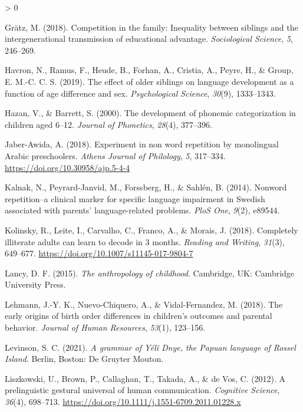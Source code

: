 \documentclass[
  english,
  ,man,floatsintext]{apa6}
\newlength{\cslhangindent}
\newenvironment{CSLReferences}[2] %
 {%
  \setlength{\parindent}{0pt}
  \ifodd #1 \everypar{\setlength{\hangindent}{\cslhangindent}}\ignorespaces\fi
  \ifnum #2 > 0
  \setlength{\parskip}{#2\baselineskip}
  \fi
 }%
 {}
\begin{document}
\begin{CSLReferences}{1}{0}
\leavevmode\hypertarget{ref-gratz2018competition}{}%
Grätz, M. (2018). Competition in the family: Inequality between siblings and the intergenerational transmission of educational advantage. \emph{Sociological Science}, \emph{5}, 246--269.

\leavevmode\hypertarget{ref-havron2019effect}{}%
Havron, N., Ramus, F., Heude, B., Forhan, A., Cristia, A., Peyre, H., \& Group, E. M.-C. C. S. (2019). The effect of older siblings on language development as a function of age difference and sex. \emph{Psychological Science}, \emph{30}(9), 1333--1343.

\leavevmode\hypertarget{ref-hazan2000development}{}%
Hazan, V., \& Barrett, S. (2000). The development of phonemic categorization in children aged 6--12. \emph{Journal of Phonetics}, \emph{28}(4), 377--396.

\leavevmode\hypertarget{ref-jabere2018xperiment}{}%
Jaber-Awida, A. (2018). Experiment in non word repetition by monolingual {A}rabic preschoolers. \emph{Athens Journal of Philology}, \emph{5}, 317--334. \url{https://doi.org/10.30958/ajp.5-4-4}

\leavevmode\hypertarget{ref-kalnak2014nonword}{}%
Kalnak, N., Peyrard-Janvid, M., Forssberg, H., \& Sahlén, B. (2014). Nonword repetition--a clinical marker for specific language impairment in {S}wedish associated with parents' language-related problems. \emph{PloS One}, \emph{9}(2), e89544.

\leavevmode\hypertarget{ref-kolinsky2018completely}{}%
Kolinsky, R., Leite, I., Carvalho, C., Franco, A., \& Morais, J. (2018). Completely illiterate adults can learn to decode in 3 months. \emph{Reading and Writing}, \emph{31}(3), 649--677. \url{https://doi.org/10.1007/s11145-017-9804-7}

\leavevmode\hypertarget{ref-lancy2015anthropology}{}%
Lancy, D. F. (2015). \emph{The anthropology of childhood}. Cambridge, UK: Cambridge University Press.

\leavevmode\hypertarget{ref-lehmann2018early}{}%
Lehmann, J.-Y. K., Nuevo-Chiquero, A., \& Vidal-Fernandez, M. (2018). The early origins of birth order differences in children's outcomes and parental behavior. \emph{Journal of Human Resources}, \emph{53}(1), 123--156.

\leavevmode\hypertarget{ref-levinsonYDgrammar}{}%
Levinson, S. C. (2021). \emph{A grammar of {Yélî D}nye, the {P}apuan language of {R}ossel {I}sland}. Berlin, Boston: De Gruyter Mouton.

\leavevmode\hypertarget{ref-liszkowski2012prelinguistic}{}%
Liszkowski, U., Brown, P., Callaghan, T., Takada, A., \& de Vos, C. (2012). A prelinguistic gestural universal of human communication. \emph{Cognitive Science}, \emph{36}(4), 698--713. \url{https://doi.org/10.1111/j.1551-6709.2011.01228.x}


\end{CSLReferences}
\end{document}
